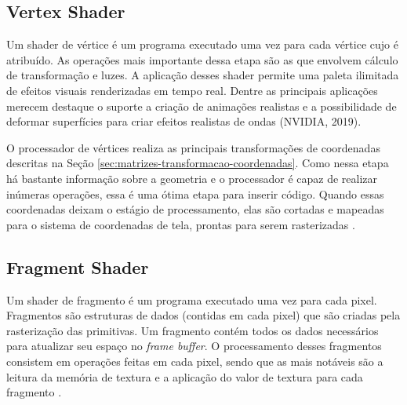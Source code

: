 \subsection{Vertex Shader}
\label{vertex-shader}

Um shader de vértice é um programa executado uma vez para cada vértice cujo é atribuído. As operações mais importante dessa etapa são as que envolvem cálculo de transformação e luzes. A aplicação desses shader permite uma paleta ilimitada de efeitos visuais renderizadas em tempo real. Dentre as principais aplicações merecem destaque o suporte a criação de animações realistas e a possibilidade de deformar superfícies para criar efeitos realistas de ondas (NVIDIA, 2019)\nocite{vertexShader}.

	\begin{figure}[h!]
		\centering
	\end{figure}
	\nocite{shaderStages}

O processador de vértices realiza as principais transformações de coordenadas descritas na Seção \ref{sec:matrizes-transformacao-coordenadas}. Como nessa etapa há bastante informação sobre a geometria e o processador é capaz de realizar inúmeras operações, essa é uma ótima etapa para inserir código. Quando essas coordenadas deixam o estágio de processamento, elas são cortadas e mapeadas para o sistema de coordenadas de tela, prontas para serem rasterizadas \cite{bailey2007}.

\subsection{Fragment Shader}
\label{sec:fragment-shader}

Um shader de fragmento é um programa executado uma vez para cada pixel. Fragmentos são estruturas de dados (contidas em cada pixel) que são criadas pela rasterização das primitivas. Um fragmento contém todos os dados necessários para atualizar seu espaço no \textit{frame buffer}. O processamento desses fragmentos consistem em operações feitas em cada pixel, sendo que as mais notáveis são a leitura da memória de textura e a aplicação do valor de textura para cada fragmento \cite{GLSLBook}. 


